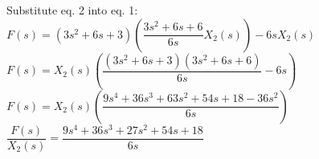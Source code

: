 \documentclass[11pt,letterpaper]{article}
\begin{document}
\vspace{1.5ex}

Substitute eq. 2 into eq. 1:\\[1ex]
$F(s) = (3s^2 + 6s + 3) \left( \dfrac{3s^2 + 6s + 6}{6s} X_2(s) \right) - 6sX_2(s)$\\[1ex]
$F(s) = X_2(s) \left( \dfrac{(3s^2 + 6s + 3)(3s^2 + 6s + 6)}{6s} - 6s \right)$\\[1ex]
$F(s) = X_2(s) \left( \dfrac{9s^4 + 36s^3 + 63s^2 + 54s + 18 - 36s^2}{6s} \right)$\\[1ex]
$\dfrac{F(s)}{X_2(s)} = \dfrac{9s^4 + 36s^3 + 27s^2 + 54s + 18}{6s}$

\begin{center}
\end{center}
\end{document}
